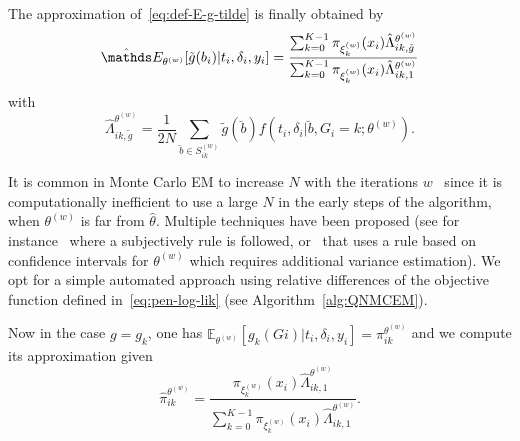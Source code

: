 \documentclass[11pt]{article}
\newcommand{\E}{\mathds E}
\begin{document}
The approximation of~\eqref{eq:def-E-g-tilde} is finally obtained by
\begin{equation}
  \label{eq:def-hat-E-g-tilde}
  \hat \E_{\theta^{(w)}}[ \tilde g(b_i) | t_i, \delta_i, y_i] = \dfrac{ \sum_{k=0}^{K-1} \pi_{\xi_k^{(w)}}(x_i) \hat \Lambda_{ik,\tilde g}^{\theta^{(w)}}}{\sum_{k=0}^{K-1} \pi_{\xi_k^{(w)}}(x_i) \hat \Lambda_{ik,1}^{\theta^{(w)}}}
\end{equation}
with
\begin{equation}
  \label{eq:hat_Lambda_ik}
  \hat \Lambda_{ik,\tilde g}^{\theta^{(w)}} = \dfrac{1}{2N} \sum_{\breve{b} \in S_{ik}^{(w)}} \tilde g(\breve{b}) f(t_i, \delta_i | \breve{b}, G_i = k ; \theta^{(w)}).
\end{equation}

It is common in Monte Carlo EM to increase $N$ with the iterations $w$~\citep{wei1990monte} since it is computationally inefficient to use a large $N$ in the early steps of the algorithm, when $\theta^{(w)}$ is far from $\hat \theta$. Multiple techniques have been proposed (see for instance~\citet{law2002joint} where a subjectively rule is followed, or~\citet{booth1999maximizing} that uses a rule based on confidence intervals for $\theta^{(w)}$ which requires additional variance estimation). We opt for a simple automated approach using relative differences of the objective function defined in~\eqref{eq:pen-log-lik} (see Algorithm~\ref{alg:QNMCEM}).

Now in the case $g = g_k$, one has $\E_{\theta^{(w)}}[g_k(Gi) | t_i, \delta_i, y_i] = \pi_{ik}^{\theta^{(w)}}$ and we compute its approximation given
\begin{equation}
\label{eq:hat_pi_ik-def}
  \hat \pi_{ik}^{\theta^{(w)}} = \dfrac{\pi_{\xi_k^{(w)}}(x_i) \hat \Lambda_{ik,1}^{\theta^{(w)}}}{\sum_{k=0}^{K-1} \pi_{\xi_k^{(w)}}(x_i) \hat \Lambda_{ik,1}^{\theta^{(w)}}}.
\end{equation}
\end{document}

